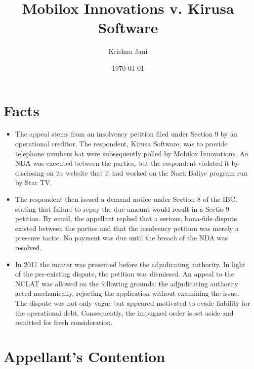 \documentclass[12pt]{article}
\author{Krishna Jani}
\date{\today}
\title{Mobilox Innovations v. Kirusa Software}
\begin{document}
\maketitle

\section*{Facts}
\label{sec:orgc7463e7}
\begin{itemize}
\item The appeal stems from an insolvency petition filed under Section 9 by an operational creditor. The respondent, Kirusa Software, was to provide telephone numbers hat were subsequently polled by Mobilox  Innovations. An NDA was executed between the parties, but the respondent violated it by disclosing on its website that it had worked on the Nach Baliye program run by Star TV.

\item The respondent then issued a demand notice under Section  8 of the IBC, stating that failure to repay the due amount would result in a Sectio 9 petition. By email, the appellant replied that a serious, bona‑fide dispute existed between the parties and that the insolvency petition was merely a pressure tactic. No payment was due until the breach of the NDA was resolved.

\item In 2017 the matter was presented before the adjudicating authority. In light of the pre‑existing dispute, the petition was dismissed. An appeal to the NCLAT was allowed on the following grounds: the adjudicating authority acted mechanically, rejecting the application without examining the issue. The dispute was not only vague but appeared motivated to evade liability for the operational debt. Consequently, the impugned order is set aside and remitted for fresh consideration.
\end{itemize}
\section*{Appellant's Contention}
\label{sec:orgedcfc8d}
\end{document}
